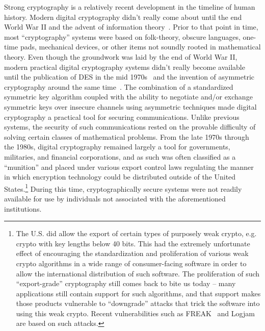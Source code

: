Strong cryptography is a relatively recent development in the timeline
of human history. Modern digital cryptography didn't really come about
until the end World War II and the advent of information
theory~\cite{shannon1945}. Prior to that point in time, most
``cryptography'' systems were based on folk-theory, obscure languages,
one-time pads, mechanical devices, or other items not soundly rooted
in mathematical theory. Even though the groundwork was laid by the end
of World War II, modern practical digital cryptography systems didn't
really become available until the publication of DES in the mid
1970s~\cite{fips46} and the invention of asymmetric cryptography
around the same time~\cite{diffie1976}. The combination of a
standardized symmetric key algorithm coupled with the ability to
negotiate and/or exchange symmetric keys over insecure channels using
asymmetric techniques made digital cryptography a practical tool for
securing communications. Unlike previous systems, the security of such
communications rested on the provable difficulty of solving certain
classes of mathematical problems. From the late 1970s through the
1980s, digital cryptography remained largely a tool for governments,
militaries, and financial corporations, and as such was often
classified as a ``munition'' and placed under various export control
laws regulating the manner in which encryption technology could be
distributed outside of the United States.\footnote{The U.S. did allow
  the export of certain types of purposely weak crypto, e.g. crypto
  with key lengths below 40 bits. This had the extremely unfortunate
  effect of encouraging the standardization and proliferation of
  various weak crypto algorithms in a wide range of consumer-facing
  software in order to allow the international distribution of such
  software. The proliferation of such ``export-grade'' cryptography
  still comes back to bite us today -- many applications still contain
  support for such algorithms, and that support makes those products
  vulnerable to ``downgrade'' attacks that trick the software into
  using this weak crypto. Recent vulnerabilities such as
  FREAK~\cite{beurdouche2015} and Logjam~\cite{adrian2015} are based
  on such attacks.} During this time, cryptographically secure systems
were not readily available for use by individuals not associated with
the aforementioned institutions.

